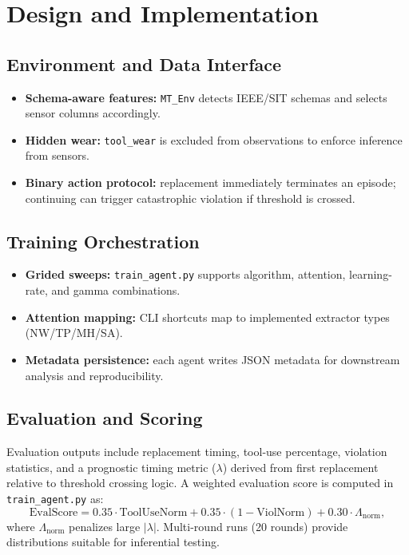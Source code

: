 \documentclass[11pt]{article}
\begin{document}
\section{Design and Implementation}
\subsection{Environment and Data Interface}
\begin{itemize}
  \item \textbf{Schema-aware features:} \texttt{MT\_Env} detects IEEE/SIT schemas and selects sensor columns accordingly.
  \item \textbf{Hidden wear:} \texttt{tool\_wear} is excluded from observations to enforce inference from sensors.
  \item \textbf{Binary action protocol:} replacement immediately terminates an episode; continuing can trigger catastrophic violation if threshold is crossed.
\end{itemize}

\subsection{Training Orchestration}
\begin{itemize}
  \item \textbf{Grided sweeps:} \texttt{train\_agent.py} supports algorithm, attention, learning-rate, and gamma combinations.
  \item \textbf{Attention mapping:} CLI shortcuts map to implemented extractor types (NW/TP/MH/SA).
  \item \textbf{Metadata persistence:} each agent writes JSON metadata for downstream analysis and reproducibility.
\end{itemize}

\subsection{Evaluation and Scoring}
Evaluation outputs include replacement timing, tool-use percentage, violation statistics, and a prognostic timing metric ($\lambda$) derived from first replacement relative to threshold crossing logic. A weighted evaluation score is computed in \texttt{train\_agent.py} as:
\begin{equation}
\text{EvalScore} = 0.35\cdot \text{ToolUseNorm} + 0.35\cdot (1-\text{ViolNorm}) + 0.30\cdot \Lambda_{\text{norm}},
\end{equation}
where $\Lambda_{\text{norm}}$ penalizes large $|\lambda|$. Multi-round runs (20 rounds) provide distributions suitable for inferential testing.
\end{document}
